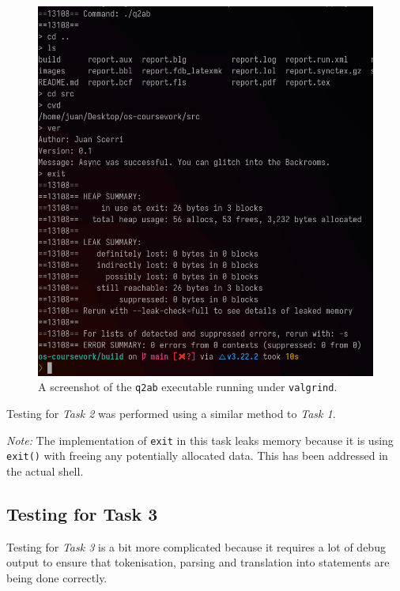 \documentclass[12pt]{article}
\begin{document}
\begin{figure}[H]
\centering
\includegraphics[width=12cm]{q2ab-test}
\caption{A screenshot of the \texttt{q2ab} executable running
under \texttt{valgrind}.}
\end{figure}

Testing for \textit{Task 2} was performed using a similar method
to \textit{Task 1}.

\textit{Note:} The implementation of \texttt{exit} in this task
leaks memory because it is using \texttt{exit()} with freeing
any potentially allocated data. This has been addressed in the
actual shell.

\subsection{Testing for Task 3}

Testing for \textit{Task 3} is a bit more complicated because it
requires a lot of debug output to ensure that tokenisation,
parsing and translation into statements are being done
correctly.

\newpage




\end{document}
